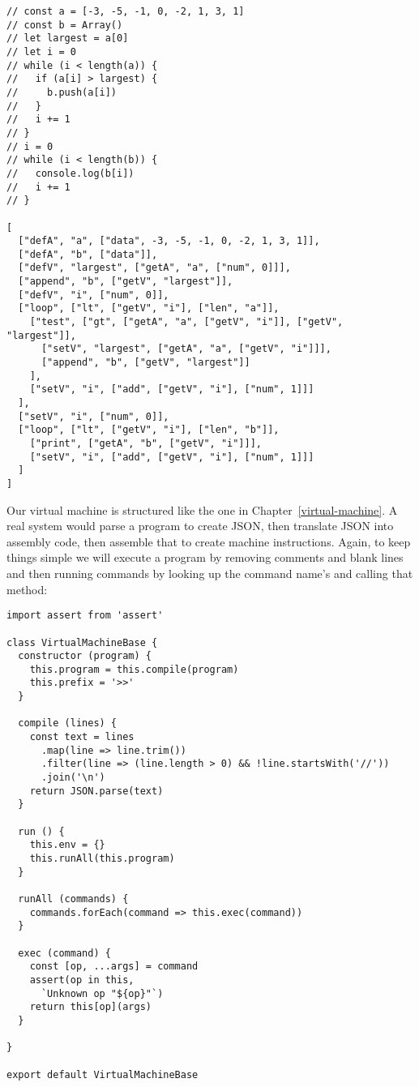 \documentclass[krantzl]{krantz}
\newcommand{\chapref}[1]{Chapter~\ref{#1}}
\begin{document}
\begin{lstlisting}[frame=single,frameround=tttt]
// const a = [-3, -5, -1, 0, -2, 1, 3, 1]
// const b = Array()
// let largest = a[0]
// let i = 0
// while (i < length(a)) {
//   if (a[i] > largest) {
//     b.push(a[i])
//   }
//   i += 1
// }
// i = 0
// while (i < length(b)) {
//   console.log(b[i])
//   i += 1
// }

[
  ["defA", "a", ["data", -3, -5, -1, 0, -2, 1, 3, 1]],
  ["defA", "b", ["data"]],
  ["defV", "largest", ["getA", "a", ["num", 0]]],
  ["append", "b", ["getV", "largest"]],
  ["defV", "i", ["num", 0]],
  ["loop", ["lt", ["getV", "i"], ["len", "a"]],
    ["test", ["gt", ["getA", "a", ["getV", "i"]], ["getV", "largest"]],
      ["setV", "largest", ["getA", "a", ["getV", "i"]]],
      ["append", "b", ["getV", "largest"]]
    ],
    ["setV", "i", ["add", ["getV", "i"], ["num", 1]]]
  ],
  ["setV", "i", ["num", 0]],
  ["loop", ["lt", ["getV", "i"], ["len", "b"]],
    ["print", ["getA", "b", ["getV", "i"]]],
    ["setV", "i", ["add", ["getV", "i"], ["num", 1]]]
  ]
]
\end{lstlisting}



Our virtual machine is structured like the one in \chapref{virtual-machine}.
A real system would parse a program to create JSON,
then translate JSON into assembly code,
then assemble that to create machine instructions.
Again,
to keep things simple we will execute a program by
removing comments and blank lines
and then running commands by looking up the command name's and calling that method:


\begin{lstlisting}[frame=single,frameround=tttt]
import assert from 'assert'

class VirtualMachineBase {
  constructor (program) {
    this.program = this.compile(program)
    this.prefix = '>>'
  }

  compile (lines) {
    const text = lines
      .map(line => line.trim())
      .filter(line => (line.length > 0) && !line.startsWith('//'))
      .join('\n')
    return JSON.parse(text)
  }

  run () {
    this.env = {}
    this.runAll(this.program)
  }

  runAll (commands) {
    commands.forEach(command => this.exec(command))
  }

  exec (command) {
    const [op, ...args] = command
    assert(op in this,
      `Unknown op "${op}"`)
    return this[op](args)
  }

}

export default VirtualMachineBase
\end{lstlisting}
\end{document}
